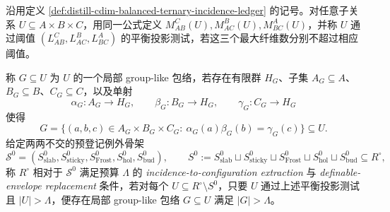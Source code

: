 \begin{definition}\label{distill:hrushovski_zilber_zariski_geometries_and_elekes_szabo_group_extraction-exceptional_stratum_dichotomy-finite-ternary-exceptional-certificate}
沿用定义 \ref{def:distill-cdim-balanced-ternary-incidence-ledger} 的记号。对任意子关系
\(U\subseteq A\times B\times C\)，用同一公式定义
\(M_{AB}^{C}(U),M_{AC}^{B}(U),M_{BC}^{A}(U)\)，并称 \(U\) 通过阈值
\((L_{AB}^{C},L_{AC}^{B},L_{BC}^{A})\) 的平衡投影测试，若这三个最大纤维数分别不超过相应阈值。

称 \(G\subseteq U\) 为 \(U\) 的一个局部 group-like 包络，若存在有限群 \(H_G\)、子集
\(A_G\subseteq A\)、\(B_G\subseteq B\)、\(C_G\subseteq C\)，以及单射
\[
\alpha_G:A_G\to H_G,\qquad \beta_G:B_G\to H_G,\qquad \gamma_G:C_G\to H_G
\]
使得
\[
G=\{(a,b,c)\in A_G\times B_G\times C_G:\ \alpha_G(a)\beta_G(b)=\gamma_G(c)\}\subseteq U.
\]
给定两两不交的预登记例外骨架
\[
\mathcal S^0=(S_{\mathrm{slab}}^0,S_{\mathrm{sticky}}^0,S_{\mathrm{Frost}}^0,S_{\mathrm{hol}}^0,S_{\mathrm{bud}}^0),
\qquad
S^0:=S_{\mathrm{slab}}^0\sqcup S_{\mathrm{sticky}}^0\sqcup S_{\mathrm{Frost}}^0\sqcup S_{\mathrm{hol}}^0\sqcup S_{\mathrm{bud}}^0\subseteq R^\circ,
\]
称 \(R^\circ\) 相对于 \(\mathcal S^0\) 满足预算 \(\Lambda\) 的
\emph{incidence-to-configuration extraction} 与
\emph{definable-envelope replacement} 条件，若对每个
\(U\subseteq R^\circ\setminus S^0\)，只要 \(U\) 通过上述平衡投影测试且
\(|U|>\Lambda\)，便存在局部 group-like 包络 \(G\subseteq U\) 满足 \(|G|>\Lambda\)。
\end{definition}


